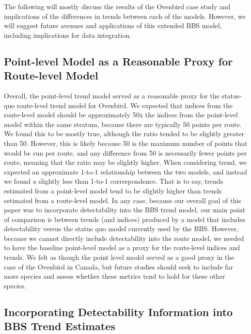 \par The following will mostly discuss the results of the Ovenbird case study and implications of the differences in trends between each of the models.
However, we will suggest future avenues and applications of this extended BBS model, including implications for data integration.

\subsection{Point-level Model as a Reasonable Proxy for Route-level Model}

\par Overall, the point-level trend model served as a reasonable proxy for the status-quo route-level trend model for Ovenbird.
We expected that indices from the route-level model should be approximately 50x the indices from the point-level model within the same stratum, because there are typically 50 points per route.
We found this to be mostly true, although the ratio tended to be slightly greater than 50.
However, this is likely because 50 is the maximum number of points that would be run per route, and any difference from 50 is necessarily fewer points per route, meaning that the ratio may be slightly higher.
When considering trend, we expected an approximate 1-to-1 relationship between the two models, and instead we found a slightly less than 1-to-1 correspondence.
That is to say, trends estimated from a point-level model tend to be slightly higher than trends estimated from a route-level model.
In any case, because our overall goal of this paper was to incorporate detectability into the BBS trend model, our main point of comparison is between trends (and indices) produced by a model that includes detectability versus the status quo model currently used by the BBS.
However, because we cannot directly include detectability into the route model, we needed to have the baseline point-level model as a proxy for the route-level indices and trends.
We felt as though the point level model served as a good proxy in the case of the Ovenbird in Canada, but future studies should seek to include far more species and assess whether these metrics tend to hold for these other species. 

\subsection{Incorporating Detectability Information into BBS Trend Estimates}

